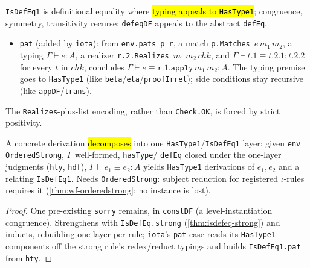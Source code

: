 \begin{definition}
\label{inductive:expb-isdefeq1}
\leanok
{}

 \texttt{IsDefEq1} is definitional equality where \hl{typing appeals to
\texttt{HasType1}}; congruence, symmetry, transitivity recurse; \texttt{defeqDF} appeals to the
abstract \texttt{defEq}.
\begin{itemize}
\item \texttt{pat} (added by \texttt{iota}): from \texttt{env.pats p r}, a match
\texttt{p.Matches}~$e\,m_1\,m_2$, a typing $\Gamma\vdash e:A$, a realizer
\texttt{r.2.Realizes}~$m_1\,m_2\,\mathit{chk}$, and $\Gamma\vdash t.1\equiv t.2.1:t.2.2$ for every
$t$ in $\mathit{chk}$, concludes $\Gamma\vdash e\equiv \mathtt{r.1.apply}\,m_1\,m_2:A$. The typing
premise goes to \texttt{HasType1} (like \texttt{beta}/\texttt{eta}/\texttt{proofIrrel}); side
conditions stay recursive (like \texttt{appDF}/\texttt{trans}).
\end{itemize}
 The \texttt{Realizes}-plus-list encoding, rather than \texttt{Check.OK}, is forced by
strict positivity.
\end{definition}

\begin{theorem}
\label{thm:expb-induction1}
\leanok
{}

 A concrete derivation \hl{decomposes} into one \texttt{HasType1}/\texttt{IsDefEq1}
layer: given \texttt{env} \texttt{OrderedStrong}, $\Gamma$ well-formed, \texttt{hasType}/%
\texttt{defEq} closed under the one-layer judgments (\texttt{hty}, \texttt{hdf}),
$\Gamma\vdash e_1\equiv e_2:A$ yields \texttt{HasType1} derivations of $e_1,e_2$ and a relating
\texttt{IsDefEq1}.
 Needs \texttt{OrderedStrong}: subject reduction for registered $\iota$-rules requires
it (\ref{thm:wf-orderedstrong}: no instance is lost).
\end{theorem}
\begin{proof}
\stSorry{} One pre-existing \texttt{sorry} remains, in \texttt{constDF} (a level-instantiation
congruence).
 Strengthens with \texttt{IsDefEq.strong} (\ref{thm:isdefeq-strong}) and inducts,
rebuilding one layer per rule; \texttt{iota}'s \texttt{pat} case reads its \texttt{HasType1}
components off the strong rule's redex/reduct typings and builds \texttt{IsDefEq1.pat} from
\texttt{hty}.
\end{proof}

